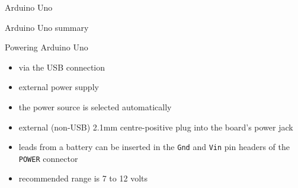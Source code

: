 \documentclass[compress]{beamer}
\begin{document}
{
    \begin{frame}{Arduino Uno}
    \end{frame}
}


{
    \begin{frame}{Arduino Uno summary}
    \end{frame}
}

    \begin{frame}{Powering Arduino Uno}
        \begin{itemize}
            \item via the USB connection
            \item external power supply
            \item the power source is selected automatically
            \item external (non-USB) 2.1mm centre-positive plug into the board's
                power jack
            \item leads from a battery can be inserted in the \texttt{Gnd} and
                \texttt{Vin} pin
                headers of the \texttt{POWER} connector
            \item recommended range is 7 to 12 volts
        \end{itemize}
    \end{frame}
\end{document}
